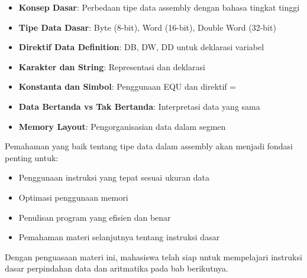 \documentclass[../main.tex]{subfiles}
\begin{document}
\begin{itemize}
    \item \textbf{Konsep Dasar}: Perbedaan tipe data assembly dengan bahasa tingkat tinggi
    \item \textbf{Tipe Data Dasar}: Byte (8-bit), Word (16-bit), Double Word (32-bit)
    \item \textbf{Direktif Data Definition}: DB, DW, DD untuk deklarasi variabel
    \item \textbf{Karakter dan String}: Representasi dan deklarasi
    \item \textbf{Konstanta dan Simbol}: Penggunaan EQU dan direktif =
    \item \textbf{Data Bertanda vs Tak Bertanda}: Interpretasi data yang sama
    \item \textbf{Memory Layout}: Pengorganisasian data dalam segmen
\end{itemize}

Pemahaman yang baik tentang tipe data dalam assembly akan menjadi fondasi penting untuk:
\begin{itemize}
    \item Penggunaan instruksi yang tepat sesuai ukuran data
    \item Optimasi penggunaan memori
    \item Penulisan program yang efisien dan benar
    \item Pemahaman materi selanjutnya tentang instruksi dasar
\end{itemize}

Dengan penguasaan materi ini, mahasiswa telah siap untuk mempelajari instruksi dasar perpindahan data dan aritmatika pada bab berikutnya.
\end{document}
